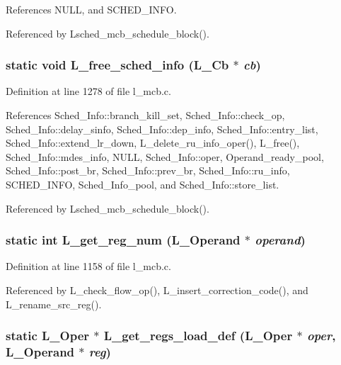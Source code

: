 References NULL, and SCHED\_\-INFO.

Referenced by Lsched\_\-mcb\_\-schedule\_\-block().
\subsubsection{\setlength{\rightskip}{0pt plus 5cm}static void L\_\-free\_\-sched\_\-info (L\_\-Cb $\ast$ {\em cb})\hspace{0.3cm}{\tt  [static]}}\label{l__mcb_8c_28e578244421a4ccae1bb527ae6aa4d1}




Definition at line 1278 of file l\_\-mcb.c.

References Sched\_\-Info::branch\_\-kill\_\-set, Sched\_\-Info::check\_\-op, Sched\_\-Info::delay\_\-sinfo, Sched\_\-Info::dep\_\-info, Sched\_\-Info::entry\_\-list, Sched\_\-Info::extend\_\-lr\_\-down, L\_\-delete\_\-ru\_\-info\_\-oper(), L\_\-free(), Sched\_\-Info::mdes\_\-info, NULL, Sched\_\-Info::oper, Operand\_\-ready\_\-pool, Sched\_\-Info::post\_\-br, Sched\_\-Info::prev\_\-br, Sched\_\-Info::ru\_\-info, SCHED\_\-INFO, Sched\_\-Info\_\-pool, and Sched\_\-Info::store\_\-list.

Referenced by Lsched\_\-mcb\_\-schedule\_\-block().
\subsubsection{\setlength{\rightskip}{0pt plus 5cm}static int L\_\-get\_\-reg\_\-num (L\_\-Operand $\ast$ {\em operand})\hspace{0.3cm}{\tt  [static]}}\label{l__mcb_8c_f533fffdb1bb0ae17afefa3264600bb9}




Definition at line 1158 of file l\_\-mcb.c.

Referenced by L\_\-check\_\-flow\_\-op(), L\_\-insert\_\-correction\_\-code(), and L\_\-rename\_\-src\_\-reg().
\subsubsection{\setlength{\rightskip}{0pt plus 5cm}static L\_\-Oper $\ast$ L\_\-get\_\-regs\_\-load\_\-def (L\_\-Oper $\ast$ {\em oper}, L\_\-Operand $\ast$ {\em reg})\hspace{0.3cm}{\tt  [static]}}\label{l__mcb_8c_e5566e98d51ae8efeae62c1587353c0d}




